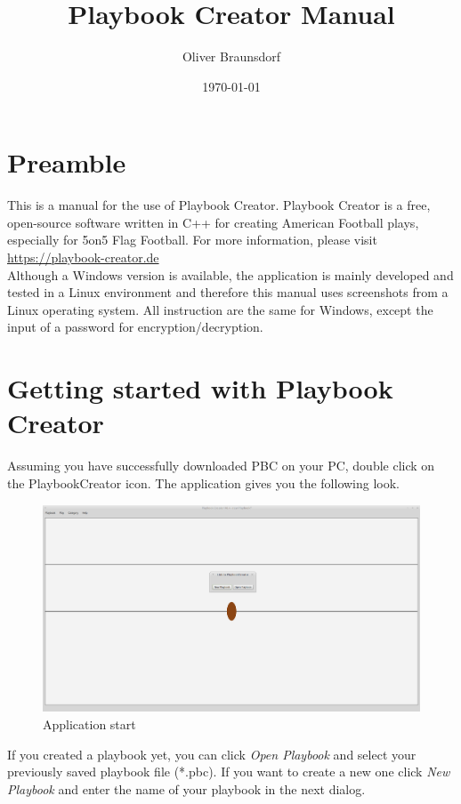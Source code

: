 \documentclass[10pt,a4paper]{article}
\title{Playbook Creator Manual}
\author{Oliver Braunsdorf}
\date{\today}
\begin{document}
	\maketitle
	\tableofcontents
	\clearpage
	
	\section{Preamble}
		This is a manual for the use of Playbook Creator. Playbook Creator is a free, open-source  software written in C++ for creating American Football plays, especially for 5on5 Flag Football. For more information, please visit \\ \mbox{\url{https://playbook-creator.de}} \\
		
		Although a Windows version is available, the application is mainly developed and tested in a Linux environment and therefore this manual uses screenshots from a Linux operating system. All instruction are the same for Windows, except the input of a password for encryption/decryption.
	\clearpage
	
	\section{Getting started with Playbook Creator}
		Assuming you have successfully downloaded PBC on your PC, double click on the PlaybookCreator icon. The application gives you the following look.
		\begin{figure}[h] \centering
			\includegraphics[scale=.2]{images/appStart.png}
			\caption{Application start}
			\label{fig:appStart}
		\end{figure}		
		If you created a playbook yet, you can click \textit{Open Playbook} and select your previously saved playbook file (*.pbc). If you want to create a new one click \textit{New Playbook} and enter the name of your playbook in the next dialog. \\
		
\end{document}
